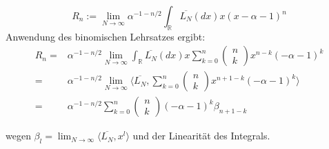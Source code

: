 \documentclass[a4paper, 11pt]{scrreprt}
\newcommand{\RR}{\mathbb{R}}
\begin{document}
\begin{equation}
R_n:=\lim_{N \to \infty} \alpha^{-1-n/2} \int_{\RR}\overline{L_{N}}(dx)x(x-\alpha-1)^{n} 
\end{equation}
Anwendung des binomischen Lehrsatzes ergibt:
\begin{align*}
 R_n =& \alpha^{-1-n/2} \lim_{N \to \infty} \int_{\RR}\overline{L_{N}}(dx)x \sum_{k=0}^n \begin{pmatrix} n\\k\end{pmatrix} x^{n-k}(-\alpha -1)^k \\
 =& \alpha^{-1-n/2} \lim_{N \to \infty} \langle \overline{L_{N}}, \sum_{k=0}^n \begin{pmatrix} n\\k\end{pmatrix} x^{n+1-k}(-\alpha -1)^k \rangle \\
 =& \alpha^{-1-n/2}\sum_{k=0}^n \begin{pmatrix} n\\k\end{pmatrix} (-\alpha -1)^k \beta_{n+1-k}
\end{align*}

wegen $\beta_l = \lim_{N\to\infty} \langle \overline{L_N}, x^l \rangle$ und der Linearität des Integrals.\\
\end{document}
